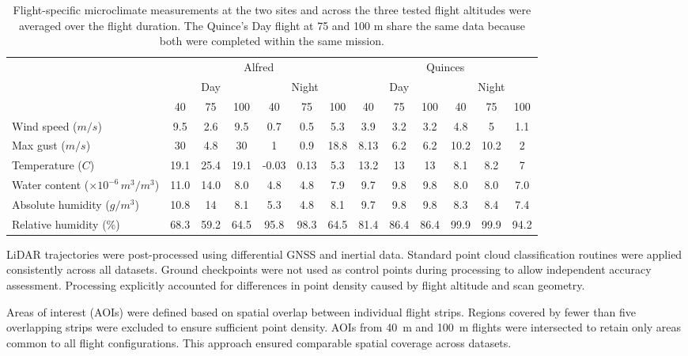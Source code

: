 \documentclass{isprs} %
\begin{document}
{
    \renewcommand{\arraystretch}{1.2}
    \begin{table}[h]
        \centering
        \begin{tabular}{l c c c | c c c | c c c | c c c}
            \toprule
            \multirow{3}{*}{} & \multicolumn{6}{c}{Alfred} & \multicolumn{6}{c}{Quinces} \\ \cline{2-13}
            &\multicolumn{3}{c}{Day}&\multicolumn{3}{c}{Night}&\multicolumn{3}{c}{Day}&\multicolumn{3}{c}{Night}\\ \cline{2-13}
            &40&75&100&40&75&100 & 40&75&100&40&75&100\\ \hline
            Wind speed ($m/s$) & 9.5 & 2.6 & 9.5 & 0.7 & 0.5 & 5.3 & 3.9 & 3.2 & 3.2 & 4.8 & 5 & 1.1 \\ \hline
            Max gust ($m/s$) & 30 & 4.8 & 30 & 1 & 0.9 & 18.8 & 8.13 & 6.2 & 6.2 & 10.2 & 10.2 & 2 \\ \hline
            Temperature ($C$) & 19.1 & 25.4 & 19.1 & -0.03 & 0.13 & 5.3 & 13.2 & 13 & 13 & 8.1 & 8.2 & 7 \\ \hline
            Water content ($\times 10^{-6}\, m^3/m^3$) & 11.0 & 14.0 & 8.0 & 4.8 & 4.8 & 7.9 & 9.7 & 9.8 & 9.8 & 8.0 & 8.0 & 7.0 \\ \hline
            Absolute humidity ($g/m^3$) & 10.8 & 14 & 8.1 & 5.3 & 4.8 & 8.1 & 9.7 & 9.8 & 9.8 & 8.3 & 8.4 & 7.4 \\ \hline
            Relative humidity (\%) & 68.3 & 59.2 & 64.5 & 95.8 & 98.3 & 64.5  & 81.4 & 86.4 & 86.4 & 99.9 & 99.9 & 94.2 \\
            \bottomrule
        \end{tabular}
        \caption{Flight-specific microclimate measurements at the two sites and across the three tested flight altitudes were averaged over the flight duration. The Quince's Day flight at 75 and 100 m share the same data because both were completed within the same mission.}
        \label{tab:microclimate}
    \end{table}
}

LiDAR trajectories were post-processed using differential GNSS and inertial data. Standard point cloud classification routines were applied consistently across all datasets. Ground checkpoints were not used as control points during processing to allow independent accuracy assessment. Processing explicitly accounted for differences in point density caused by flight altitude and scan geometry.

Areas of interest (AOIs) were defined based on spatial overlap between individual flight strips. Regions covered by fewer than five overlapping strips were excluded to ensure sufficient point density. AOIs from 40~m and 100~m flights were intersected to retain only areas common to all flight configurations. This approach ensured comparable spatial coverage across datasets.
\end{document}
